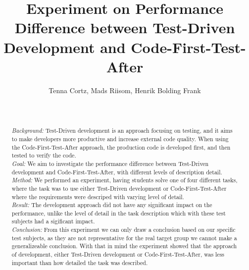 \documentclass{sig-alternate-05-2015}
\begin{document}
	

\title{Experiment on Performance Difference between Test-Driven Development and Code-First-Test-After}

\author{
\alignauthor
Tenna Cortz, Mads Riisom, Henrik Bolding Frank\\
 \\
 \\
}


\maketitle
\begin{abstract}
 \textit{Background:} Test-Driven development is an approach focusing on testing, and it aims to make developers more productive and increase external code quality. When using the Code-First-Test-After approach, the production code is developed first, and then tested to verify the code.\\
[0.0em]
 \textit{Goal:} We aim to investigate the performance difference between Test-Driven development and Code-First-Test-After, with different levels of description detail.\\
[0.0em]
 \textit{Method:} We performed an experiment, having students solve one of four different tasks, where the task was to use either Test-Driven development or Code-First-Test-After where the requirements were descriped with varying level of detail.\\
[0.0em]
 \textit{Result:} The development approach did not have any significant impact on the performance, unlike the level of detail in the task description which with these test subjects had a sigificant impact.\\
[0.0em]
 \textit{Conclusion:} From this experiment we can only draw a conclusion based on our specific test subjects, as they are not representative for the real target group we cannot make a generalizeable conclusion. With that in mind the experiment showed that the approach of development, either Test-Driven development or Code-First-Test-After, was less important than how detailed the task was described.

\end{abstract}
\end{document}
